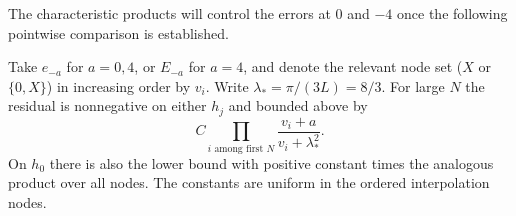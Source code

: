 The characteristic products will control the errors at $0$ and $-4$ once the following pointwise comparison is established.

\begin{auxlemma} Take $e_{-a}$ for $a=0,4$, or $E_{-a}$ for $a=4$, and denote the relevant node set ($X$ or $\{0,X\}$) in increasing order by $v_i$. Write $\lambda_*=\pi/(3L)=8/3$. For large $N$ the residual is nonnegative on either $h_j$ and bounded above by
\begin{equation}
 C\prod_{i\text{ among first }N}\frac{v_i+a}{v_i+\lambda_*^2}.
                                                                    \label{eq:legacy-P-10}
\end{equation}
On $h_0$ there is also the lower bound with positive constant times the analogous product over all nodes. The constants are uniform in the ordered interpolation nodes.
\end{auxlemma}
